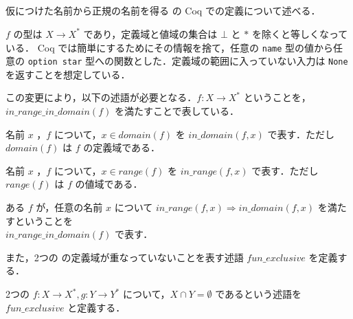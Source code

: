 


\subsection{\tmp}

仮につけた名前から正規の名前を得る \tmp の Coq での定義について述べる．

\tmp $ f $ の型は $X \rightarrow X^* $ であり，定義域と値域の集合は $\bot$ と $\ast$ を除くと等しくなっている．
Coq では簡単にするためにその情報を捨て，任意の {\tt name} 型の値から任意の {\tt option star} 型への関数とした．定義域の範囲に入っていない入力は {\tt None} を返すことを想定している．

この変更により，以下の述語が必要となる．$f : X \rightarrow X^*$ ということを，$in\_range\_in\_domain(f)$ を満たすことで表している．

\begin{dfn}[$in\_domain$]
  名前 $x$ ，\tmp $f$ について，$x \in domain(f)$ を $in\_domain(f,x)$ で表す．ただし $domain(f)$ は $f$ の定義域である．
\end{dfn}

\begin{dfn}[$in\_range$]
  名前 $x$ ，\tmp $f$ について，$x \in range(f)$ を $in\_range(f,x)$ で表す．ただし $range(f)$ は $f$ の値域である．
\end{dfn}

\begin{dfn}
  ある \tmp $f$ が，任意の名前 $x$ について $in\_range(f, x) \Rightarrow in\_domain(f, x)$ を満たすということを \\
  $in\_range\_in\_domain(f)$ で表す．
\end{dfn}


また，2つの \tmp の定義域が重なっていないことを表す述語 $fun\_exclusive$ を定義する．

\begin{dfn}
  2つの \tmp $f : X \rightarrow X^*, g : Y \rightarrow Y^*$ について，$X \cap Y = \emptyset$ であるという述語を $fun\_exclusive$ と定義する．
\end{dfn}

